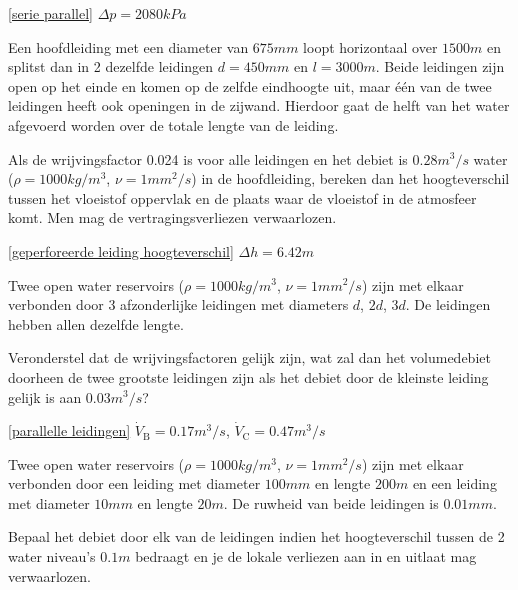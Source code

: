 \begin{antwoord}{\ref{serie parallel}}
	$\Delta p = 2080\unit{kPa}$
\end{antwoord}
\begin{toepassing}
	\label{geperforeerde leiding hoogteverschil}
Een hoofdleiding met een diameter van $675\unit{mm}$ loopt horizontaal over $1500\unit{m}$ en splitst dan in 2 dezelfde leidingen $d=450\unit{mm}$ en $l=3000\unit{m}$. Beide leidingen zijn open op het einde en komen op de zelfde eindhoogte uit, maar één van de twee leidingen heeft ook openingen in de zijwand. Hierdoor gaat de helft van het water afgevoerd worden over de totale lengte van de leiding.

Als de wrijvingsfactor 0.024 is voor alle leidingen en het debiet is $0.28\unit{m^3/s}$ water ($\rho=1000\unit{kg/m^3}$, $\nu=1\unit{mm^2/s}$) in de hoofdleiding, bereken dan het hoogteverschil tussen het vloeistof oppervlak en de plaats waar de vloeistof in de atmosfeer komt. Men mag de vertragingsverliezen verwaarlozen.
\end{toepassing}
\begin{antwoord}{\ref{geperforeerde leiding hoogteverschil}}
	$\Delta h = 6.42\unit{m}$
\end{antwoord}
\begin{toepassing}
	\label{parallelle leidingen}
Twee open water reservoirs ($\rho=1000\unit{kg/m^3}$, $\nu=1\unit{mm^2/s}$) zijn met elkaar verbonden door 3 afzonderlijke leidingen met diameters $d$, $2d$, $3d$. De leidingen hebben allen dezelfde lengte.
		
Veronderstel dat de wrijvingsfactoren gelijk zijn, wat zal dan het volumedebiet doorheen de twee grootste leidingen zijn als het debiet door de kleinste leiding gelijk is aan $0.03\unit{m^3/s}$? 
\end{toepassing}
\begin{antwoord}{\ref{parallelle leidingen}}
	$\dot{V}_\mathrm{B} = 0.17\unit{m^3/s}$, $\dot{V}_\mathrm{C} = 0.47\unit{m^3/s}$
\end{antwoord}
\begin{toepassing}[*]
	\label{turbulent laminair}
	Twee open water reservoirs ($\rho=1000\unit{kg/m^3}$, $\nu=1\unit{mm^2/s}$) zijn met elkaar verbonden door een leiding met diameter $100\unit{mm}$ en lengte $200\unit{m}$ en een leiding met diameter $10\unit{mm}$ en lengte $20\unit{m}$. De ruwheid van beide leidingen is $0.01\unit{mm}$.
	
Bepaal het debiet door elk van de leidingen indien het hoogteverschil tussen de 2 water niveau's $0.1\unit{m}$ bedraagt en je de lokale verliezen aan in en uitlaat mag verwaarlozen.
\end{toepassing}

